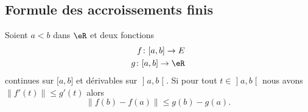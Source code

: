 \subsection{Formule des accroissements finis}

\begin{proposition} \label{PropDQLhSoy}
	Soient \( a<b\) dans \( \eR\) et deux fonctions
	\begin{subequations}
		\begin{align}
			f\colon \mathopen[ a , b \mathclose]\to E \\
			g\colon \mathopen[ a , b \mathclose]\to \eR
		\end{align}
	\end{subequations}
	continues sur \( \mathopen[ a , b \mathclose]\) et dérivables sur \( \mathopen] a , b \mathclose[\). Si pour tout \( t\in\mathopen] a , b \mathclose[\) nous avons \( \| f'(t) \|\leq g'(t)\) alors
	\begin{equation}
		\| f(b)-f(a) \|\leq g(b)-g(a).
	\end{equation}
\end{proposition}

